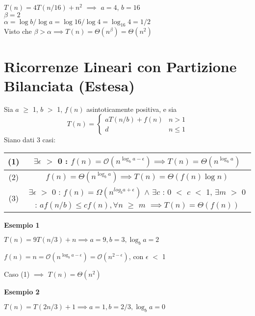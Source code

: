 \documentclass[../cheatSheetAlgoritmi.tex]{subfiles}
\begin{document}
$T(n) = 4T(n/16) + n^{2}$ $\implies$ $a = 4$, $b = 16$\\
$\beta = 2$\\
$\alpha = \log{b} / \log{a} = \log{16} / \log{4} = \log_{16}{4} = 1/2$\\
Visto che $\beta > \alpha \implies T(n) = \Theta(n^{\beta}) = \Theta(n^{2})$

\section{Ricorrenze Lineari con Partizione Bilanciata (Estesa)}
Sia $a$ $\geq$ 1, $b$ $>$ 1, $f(n)$ asintoticamente positiva, e sia
	\begin{equation*}
  		T(n)=\begin{cases}
    		aT(n/b) + f(n) & \text{$n > 1$}\\
    		d & \text{$n \leq 1$}
  		\end{cases}
	\end{equation*}
Siano dati 3 casi:

\begin{center}
	\renewcommand{\arraystretch}{1.2}
	\begin{tabular}{ |c|c| } 
		\hline
			(1) & $\exists \epsilon$ $>$ 0 : $f(n) = \mathcal{O}(n^{\log_{b}{a} - \epsilon}) \implies T(n) = \Theta(n^{\log_{b}{a}})$\\
		\hline
			(2) & $f(n) = \Theta(n^{\log_{b}{a}}) \implies T(n) = \Theta(f(n) \log{n})$\\
		\hline
			(3) & \makecell{$\exists \epsilon$ $>$ 0 : $f(n) = \Omega(n^{log_{b}{a} + \epsilon})$ $\wedge$ \\ $\exists c$ : 0 $<$ $c$ $<$ 1, $\exists m$ $>$ 0 : \\ $af(n/b) \leq cf(n), \forall n$ $\geq$ $m$} $\implies T(n) = \Theta(f(n))$ \\
		\hline
	\end{tabular}
\end{center}
\textbf{Esempio 1}

$T(n) = 9T(n/3) + n \implies a = 9, b = 3, \log_{b}{a} = 2$

$f(n) = n = \mathcal{O}(n^{\log_{b}{a} - \epsilon}) =  \mathcal{O}(n^{2 - \epsilon})$, con $\epsilon$ $<$ 1

Caso (1) $\implies$ $T(n) = \Theta(n^{2})$

\bigskip

\textbf{Esempio 2}

$T(n) = T(2n/3) + 1 \implies a = 1, b = 2/3, \log_{b}{a} = 0$
\end{document}
